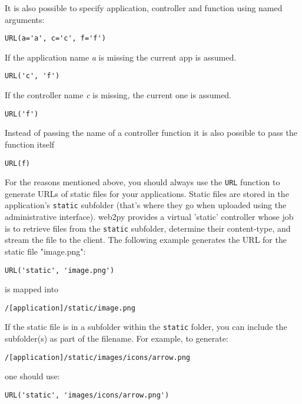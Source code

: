 \documentclass[justified,sixbynine,notoc]{tufte-book}
\def\ft{\small\tt}
\begin{document}
\begin{fullwidth}
It is also possible to specify application, controller and function using named arguments:

\begin{lstlisting}
URL(a='a', c='c', f='f')
\end{lstlisting}

If the application name {\it a} is missing the current app is assumed.

\begin{lstlisting}
URL('c', 'f')
\end{lstlisting}

If the controller name {\it c} is missing, the current one is assumed.

\begin{lstlisting}
URL('f')
\end{lstlisting}

Instead of passing the name of a controller function it is also possible to pass the function itself

\begin{lstlisting}
URL(f)
\end{lstlisting}

For the reasons mentioned above, you should always use the {\ft URL} function to generate URLs of static files for your applications. Static files are stored in the application's {\ft static} subfolder (that's where they go when uploaded using the administrative interface). web2py provides a virtual 'static' controller whose job is to retrieve files from the {\ft static} subfolder, determine their content-type, and stream the file to the client. The following example generates the URL for the static file "image.png":

\begin{lstlisting}
URL('static', 'image.png')
\end{lstlisting}
\noindent is mapped into

\begin{lstlisting}
/[application]/static/image.png
\end{lstlisting}

If the static file is in a subfolder within the {\ft static} folder, you can include the subfolder(s) as part of the filename. For example, to generate:

\begin{lstlisting}
/[application]/static/images/icons/arrow.png
\end{lstlisting}
\noindent one should use:

\begin{lstlisting}
URL('static', 'images/icons/arrow.png')
\end{lstlisting}


\end{fullwidth}
\end{document}
